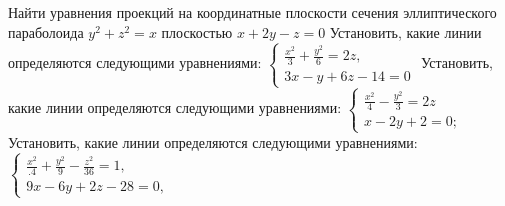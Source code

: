 Найти уравнения проекций на координатные плоскости сечения эллиптического параболоида $y^2+z^2=x$ плоскостью $x+2 y-z=0$
Установить, какие линии определяются следующими уравнениями: $\left\{\begin{array}{l}\frac{x^2}{3}+\frac{y^2}{6}=2 z, \\ 3 x-y+6 z-14=0\end{array}\right.$
Установить, какие линии определяются следующими уравнениями: $\left\{\begin{array}{l}\frac{x^2}{4}-\frac{y^2}{3}=2 z \\ x-2 y+2=0 ;\end{array}\right.$
Установить, какие линии определяются следующими уравнениями: $\left\{\begin{array}{l}\frac{x^2}{.4}+\frac{y^2}{9}-\frac{z^2}{36}=1, \\ 9 x-6 y+2 z-28=0,\end{array}\right.$